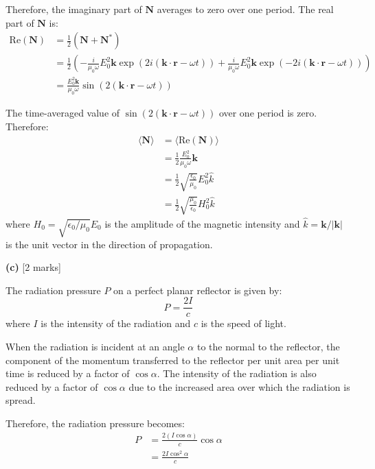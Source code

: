 \documentclass{article}
\begin{document}
Therefore, the imaginary part of $\mathbf{N}$ averages to zero over one period. The real part of $\mathbf{N}$ is:
\begin{align*}
\text{Re}(\mathbf{N}) &= \frac{1}{2} \left( \mathbf{N} + \mathbf{N}^* \right) \\
&= \frac{1}{2} \left( -\frac{i}{\mu_0 \omega} E_0^2 \mathbf{k} \exp(2i (\mathbf{k} \cdot \mathbf{r} - \omega t)) + \frac{i}{\mu_0 \omega} E_0^2 \mathbf{k} \exp(-2i (\mathbf{k} \cdot \mathbf{r} - \omega t)) \right) \\
&= \frac{E_0^2 \mathbf{k}}{\mu_0 \omega} \sin(2 (\mathbf{k} \cdot \mathbf{r} - \omega t))
\end{align*}

The time-averaged value of $\sin(2 (\mathbf{k} \cdot \mathbf{r} - \omega t))$ over one period is zero. Therefore:
\begin{align*}
\langle \mathbf{N} \rangle &= \langle \text{Re}(\mathbf{N}) \rangle \\
&= \frac{1}{2} \frac{E_0^2}{\mu_0 \omega} \mathbf{k} \\
&= \frac{1}{2} \sqrt{\frac{\epsilon_0}{\mu_0}} E_0^2 \hat{k} \\
&= \frac{1}{2} \sqrt{\frac{\mu_0}{\epsilon_0}} H_0^2 \hat{k}
\end{align*}
where $H_0 = \sqrt{\epsilon_0/\mu_0} E_0$ is the amplitude of the magnetic intensity and $\hat{k} = \mathbf{k}/|\mathbf{k}|$ is the unit vector in the direction of propagation.

\textbf{(c)} [2 marks]

The radiation pressure $P$ on a perfect planar reflector is given by:
\begin{equation*}
P = \frac{2I}{c}
\end{equation*}
where $I$ is the intensity of the radiation and $c$ is the speed of light.

When the radiation is incident at an angle $\alpha$ to the normal to the reflector, the component of the momentum transferred to the reflector per unit area per unit time is reduced by a factor of $\cos \alpha$. The intensity of the radiation is also reduced by a factor of $\cos \alpha$ due to the increased area over which the radiation is spread.

Therefore, the radiation pressure becomes:
\begin{align*}
P &= \frac{2 (I \cos \alpha)}{c} \cos \alpha \\
&= \frac{2I \cos^2 \alpha}{c}
\end{align*}
\end{document}

